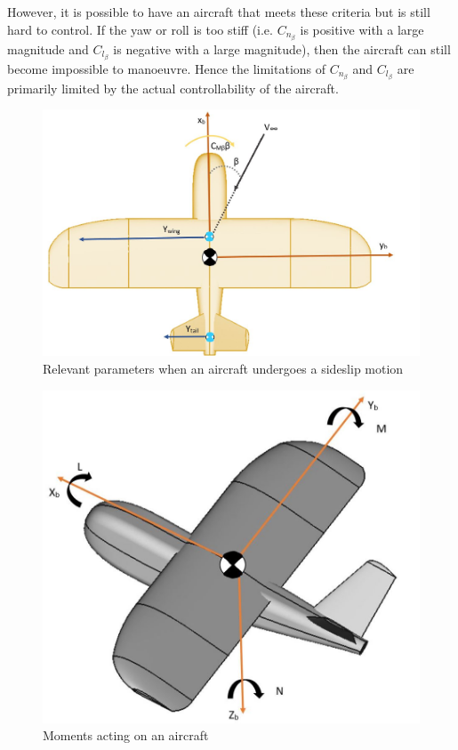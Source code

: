 However, it is possible to have an aircraft that meets these criteria but is still hard to control. If the yaw or roll is too stiff (i.e. $C_{n_\beta}$ is positive with a large magnitude and $C_{l_\beta}$ is negative with a large magnitude), then the aircraft can still become impossible to manoeuvre. Hence the limitations of $C_{n_\beta}$ and $C_{l_\beta}$ are primarily limited by the actual controllability of the aircraft. 




\begin{figure}[H]
  \centering
   \includegraphics[width=0.8\linewidth]{03_LiteratureReview/Figs/sideslip.JPG}
  \caption{Relevant parameters when an aircraft undergoes a sideslip motion}
  \label{fig:sideslip}
\end{figure}


\begin{figure}[H]
  \centering
   \includegraphics[width=0.7\linewidth]{03_LiteratureReview/Figs/axes2.JPG}
  \caption{Moments acting on an aircraft}
  \label{fig:pitch}
\end{figure}




